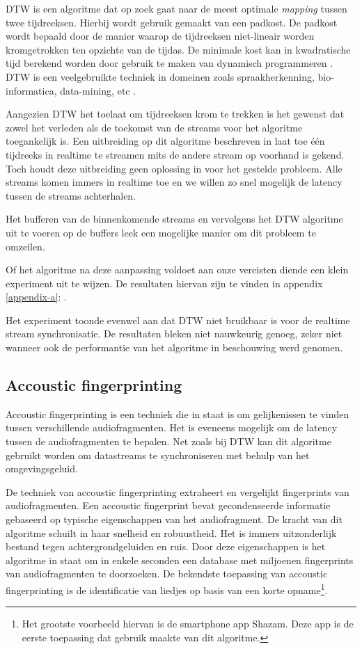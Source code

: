 DTW is een algoritme dat op zoek gaat naar de meest optimale \textit{mapping} tussen twee tijdreeksen. Hierbij wordt gebruik gemaakt van een padkost. De padkost wordt bepaald door de manier waarop de tijdreeksen niet-lineair worden kromgetrokken ten opzichte van de tijdas\cite{salvador2007toward}. De minimale kost kan in kwadratische tijd berekend worden door gebruik te maken van dynamisch programmeren \cite{dixon2005live}. DTW is een veelgebruikte techniek in domeinen zoals spraakherkenning, bio-informatica, data-mining, etc \cite{ratanamahatana2004everything}.

Aangezien DTW het toelaat om tijdreeksen krom te trekken is het gewenst dat zowel het verleden als de toekomst van de streams voor het algoritme toegankelijk is. Een uitbreiding op dit algoritme beschreven in \cite{dixon2005live} laat toe één tijdreeks in realtime te streamen mits de andere stream op voorhand is gekend. Toch houdt deze uitbreiding geen oplossing in voor het gestelde probleem. Alle streams komen immers in realtime toe en we willen zo snel mogelijk de latency tussen de streams achterhalen.

Het bufferen van de binnenkomende streams en vervolgens het DTW algoritme uit te voeren op de buffers leek een mogelijke manier om dit probleem te omzeilen.

Of het algoritme na deze aanpassing voldoet aan onze vereisten diende een klein experiment uit te wijzen. De resultaten hiervan zijn te vinden in appendix \ref{appendix-a}: .

Het experiment toonde evenwel aan dat DTW niet bruikbaar is voor de realtime stream synchronisatie. De resultaten bleken niet nauwkeurig genoeg, zeker niet wanneer ook de performantie van het algoritme in beschouwing werd genomen.

\subsection{Accoustic fingerprinting}

Accoustic fingerprinting is een techniek die in staat is om gelijkenissen te vinden tussen verschillende audiofragmenten. Het is eveneens mogelijk om de latency tussen de audiofragmenten te bepalen. Net zoals bij DTW kan dit algoritme gebruikt worden om datastreams te synchroniseren met behulp van het omgevingsgeluid.

De techniek van accoustic fingerprinting extraheert en vergelijkt fingerprints van audiofragmenten. Een accoustic fingerprint bevat gecondenseerde informatie gebaseerd op typische eigenschappen van het audiofragment. De kracht van dit algoritme schuilt in haar snelheid en robuustheid. Het is immers uitzonderlijk bestand tegen achtergrondgeluiden en ruis. Door deze eigenschappen is het algoritme in staat om in enkele seconden een database met miljoenen fingerprints van audiofragmenten te doorzoeken. De bekendste toepassing van accoustic fingerprinting is de identificatie van liedjes op basis van een korte opname\footnote{Het grootste voorbeeld hiervan is de smartphone app Shazam. Deze app is de eerste toepassing dat gebruik maakte van dit algoritme.}.


